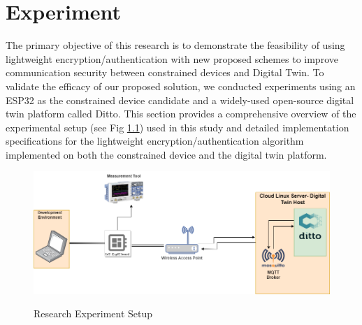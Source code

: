 

\chapter{Experiment}
\label{Chapter4} %

The primary objective of this research is to demonstrate the feasibility of using lightweight encryption/authentication with new proposed  schemes to improve communication security between constrained devices and Digital Twin. To validate the efficacy of our proposed solution, we conducted experiments using an ESP32 as the constrained device candidate and a widely-used open-source digital twin platform called Ditto. This section provides a comprehensive overview of the experimental setup (see Fig \ref{fig:experiment-setup}) used in this study and detailed implementation specifications for the lightweight encryption/authentication algorithm implemented on both the constrained device and the digital twin platform.

\begin{figure}[H]
    \caption{Research Experiment Setup}
    \centering
    \includegraphics[width=\textwidth]{images/fp/experiment.drawio.png}
    \label{fig:experiment-setup}
\end{figure}

















